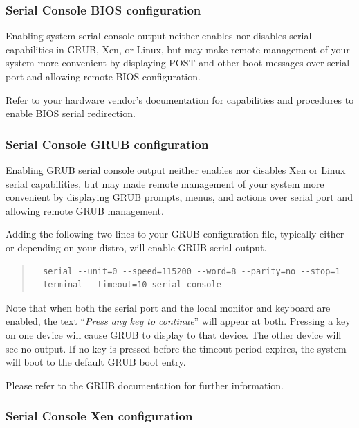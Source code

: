 \documentclass[11pt,twoside,final,openright]{report}
\begin{document}
\subsubsection{Serial Console BIOS configuration}

Enabling system serial console output neither enables nor disables
serial capabilities in GRUB, Xen, or Linux, but may make remote
management of your system more convenient by displaying POST and other
boot messages over serial port and allowing remote BIOS configuration.

Refer to your hardware vendor's documentation for capabilities and
procedures to enable BIOS serial redirection.


\subsubsection{Serial Console GRUB configuration}

Enabling GRUB serial console output neither enables nor disables Xen or
Linux serial capabilities, but may made remote management of your system
more convenient by displaying GRUB prompts, menus, and actions over
serial port and allowing remote GRUB management.

Adding the following two lines to your GRUB configuration file,
typically either  or 
depending on your distro, will enable GRUB serial output.

\begin{quote} 
{\small \begin{verbatim}
  serial --unit=0 --speed=115200 --word=8 --parity=no --stop=1
  terminal --timeout=10 serial console
\end{verbatim}}
\end{quote}

Note that when both the serial port and the local monitor and keyboard
are enabled, the text ``\emph{Press any key to continue}'' will appear
at both.  Pressing a key on one device will cause GRUB to display to
that device.  The other device will see no output.  If no key is
pressed before the timeout period expires, the system will boot to the
default GRUB boot entry.

Please refer to the GRUB documentation for further information.


\subsubsection{Serial Console Xen configuration}
\end{document}
